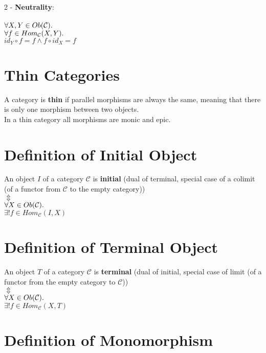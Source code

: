 \documentclass[a4paper, twoside, english, 11pt]{book}
\newcommand{\C}{\mathcal C}
\begin{document}
2 - \textbf{Neutrality}: \\\\
\indent\indent
$\forall X, Y \in Ob(\C) \ldotp$ \\
\indent\indent
$\forall f \in Hom_\C(X, Y) \ldotp$ \\
\indent\indent
$id_Y \circ f = f \land f \circ id_X = f$ \\



\section{Thin Categories}

A category is \textbf{thin} if parallel morphisms are always the same, meaning that there is only one morphism between two objects. \\

In a thin category all morphisms are monic and epic.



\section{Definition of Initial Object}

An object $I$ of a category $\C$ is \textbf{initial} (dual of terminal, special case of a colimit (of a functor from $\C$ to the empty category)) \\
\indent
$\Updownarrow$ \\ %
$\forall X \in Ob(\C) \ldotp$ \\
$\exists! f \in Hom_\C(I, X)$



\section{Definition of Terminal Object}

An object $T$ of a category $\C$ is \textbf{terminal} (dual of initial, special case of limit (of a functor from the empty category to $\C$)) \\
\indent
$\Updownarrow$ \\ %
$\forall X \in Ob(\C) \ldotp$ \\
$\exists! f \in Hom_\C(X, T)$



\section{Definition of Monomorphism}
\end{document}
